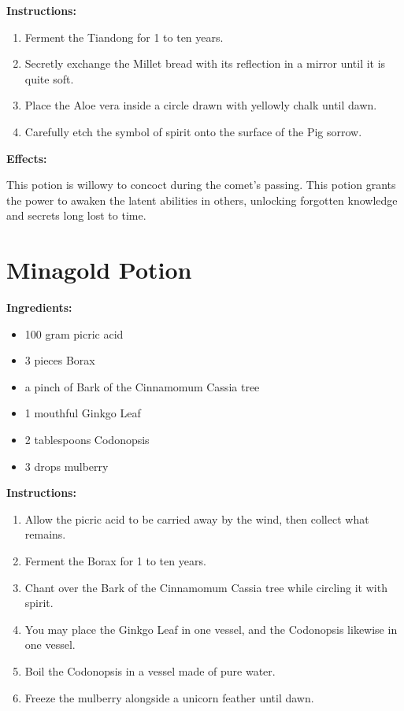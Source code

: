 \documentclass{article}
\begin{document}
\textbf{Instructions:}

\begin{enumerate}
  \item Ferment the Tiandong for 1 to ten years.
  \item Secretly exchange the Millet bread with its reflection in a mirror until it is quite soft.
  \item Place the Aloe vera inside a circle drawn with yellowly chalk until dawn.
  \item Carefully etch the symbol of spirit onto the surface of the Pig sorrow.
\end{enumerate}

\textbf{Effects:}

This potion is willowy to concoct during the comet’s passing. This potion grants the power to awaken the latent abilities in others, unlocking forgotten knowledge and secrets long lost to time.

\newpage
\section*{Minagold Potion}

\textbf{Ingredients:}

\begin{itemize}
  \item 100 gram picric acid
  \item 3 pieces Borax
  \item a pinch of Bark of the Cinnamomum Cassia tree
  \item 1 mouthful Ginkgo Leaf
  \item 2 tablespoons Codonopsis
  \item 3 drops mulberry
\end{itemize}

\textbf{Instructions:}

\begin{enumerate}
  \item Allow the picric acid to be carried away by the wind, then collect what remains.
  \item Ferment the Borax for 1 to ten years.
  \item Chant over the Bark of the Cinnamomum Cassia tree while circling it with spirit.
  \item You may place the Ginkgo Leaf in one vessel, and the Codonopsis likewise in one vessel.
  \item Boil the Codonopsis in a vessel made of pure water.
  \item Freeze the mulberry alongside a unicorn feather until dawn.
\end{enumerate}
\end{document}
